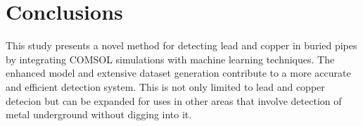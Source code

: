 \chapter{Conclusions}
\noindent
This study presents a novel method for detecting lead and copper in buried pipes by integrating COMSOL simulations with machine learning techniques. The enhanced model and extensive dataset generation contribute to a more accurate and efficient detection system. This is not only limited to lead and copper detecion but can be expanded for uses in other areas that involve detection of metal underground without digging into it.

% 				
% 


